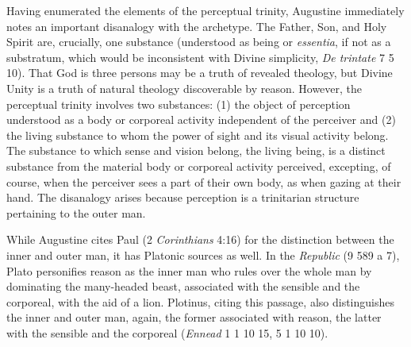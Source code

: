 \documentclass[12pt]{article}
\begin{document}
Having enumerated the elements of the perceptual trinity, Augustine immediately notes an important disanalogy with the archetype. The Father, Son, and Holy Spirit are, crucially, one substance (understood as being or \emph{essentia}, if not as a substratum, which would be inconsistent with Divine simplicity, \emph{De trintate} 7 5 10). That God is three persons may be a truth of revealed theology, but Divine Unity is a truth of natural theology discoverable by reason. However, the perceptual trinity involves two substances: (1) the object of perception understood as a body or corporeal activity independent of the perceiver and (2) the living substance to whom the power of sight and its visual activity belong. The substance to which sense and vision belong, the living being, is a distinct substance from the material body or corporeal activity perceived, excepting, of course, when the perceiver sees a part of their own body, as when gazing at their hand. The disanalogy arises because perception is a trinitarian structure pertaining to the outer man.

While Augustine cites Paul (2 \emph{Corinthians} 4:16) for the distinction between the inner and outer man, it has Platonic sources as well. In the \emph{Republic} (9 589 a 7), Plato personifies reason as the inner man who rules over the whole man by dominating the many-headed beast, associated with the sensible and the corporeal, with the aid of a lion. Plotinus, citing this passage, also distinguishes the inner and outer man, again, the former associated with reason, the latter with the sensible and the corporeal (\emph{Ennead} 1 1 10 15, 5 1 10 10). 
\end{document}
